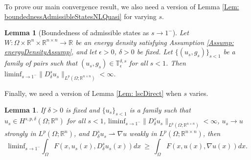 \documentclass[11pt, reqno]{amsart}   	%
\theoremstyle{plain}
\numberwithin{equation}{section}
\newtheorem{lemma}[thm]{Lemma}
\def\de{\delta}
\def\ep{\epsilon}
\def\Om{\Omega}
\def\R{\mathbb{R}}
\def\grad{\nabla}
\def\liminf{\text{liminf}}
\begin{document}
To prove our main convergence result, we also need a version of Lemma \ref{Lem: boundednessAdmissibleStatesNLQuasi} for varying $s$. 

 \begin{lemma}[Boundedness of admissible states as $s \rightarrow 1^-$]\label{Lem: boundednessAdmissibleStatesNLQuasis->1}
        Let $W: \Om \times \R^n \times \R^{n \times n} \rightarrow \R$ be an energy density satisfying Assumption \ref{Assump: energyDensityAssump}, and let $\ep > 0$, $\de > 0$ be fixed. Let $\{(u_s, g_s)\}_{s < 1}$ be a family of pairs such that $(u_s, g_s) \in \mathbb{T}^{\de, s}_{\ep}$ for all $s < 1$. Then $\liminf_{s \rightarrow 1^-}\|D^s_{\de}u_s\|_{L^p(\Om; \R^{n \times n})} < \infty$.
    \end{lemma}

Finally, we need a version of Lemma \ref{Lem: lscDirect} when $s$ varies.

\begin{lemma}\label{Lem: lscs->1}
    If $\de > 0$ is fixed and $\{u_s\}_{s < 1}$ is a family such that $u_s \in H^{s, p, \de}(\Om; \R^n)$ for all $s < 1$, $\liminf_{s \rightarrow 1^-}\|D^s_{\de} u_s\|_{L^p(\Om; \R^{n \times n})} < \infty$, $u_s \rightarrow u$ strongly in $L^p(\Om; \R^n)$, and $D^s_{\de} u_s \rightharpoonup \grad u$ weakly in $L^p(\Om; \R^{n \times n})$, then
            \begin{equation}\label{Eq: lscFs->1}
                \liminf_{s \rightarrow 1^-}\int_{\Om}F(x, u_s(x), D^s_{\de}u_s(x))dx \ \geq \ \int_{\Om}F(x, u(x), \grad u(x))dx.
            \end{equation}
\end{lemma}
\end{document}
